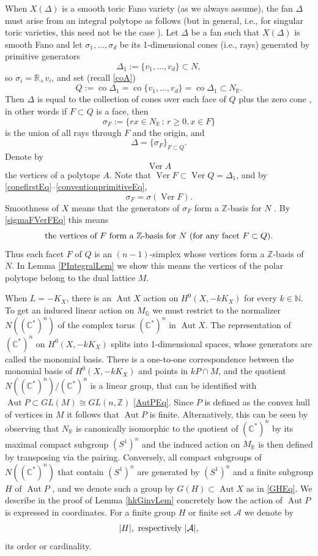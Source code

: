 \documentclass{article}
\newcommand\cA{{\mathcal A}}
\newcommand{\CC}{\mathbb {C}}
\newcommand{\NN}{{\mathbb N}}
\newcommand{\QQ}{{\mathbb Q}}
\newcommand{\RR}{{\mathbb R}}
\newcommand{\ZZ}{{\mathbb Z}}
\renewcommand{\>}{\rightarrow}
\DeclareMathOperator{\Aut}{Aut}
\DeclareMathOperator{\Ver}{Ver}
\DeclareMathOperator{\co}{co}
\theoremstyle{plain}
\theoremstyle{definition}
\newcommand{\beq}{\begin{equation}}
\newcommand{\eeq}{\end{equation}}
\def\lb#1{\label{#1}}
\begin{document}
When $X(\Delta)$ is a smooth
toric Fano variety (as we always assume), the fan $\Delta$
must arise from %
an integral polytope as 
follows (but in general, i.e., for 
singular toric varieties, this need not be the case \cite[p. 25]{Ful}).
Let $\Delta$ be a fan such that
$X(\Delta)$ is smooth Fano and let $\sigma_1,\ldots,\sigma_d$ be its 1-dimensional cones
(i.e., rays) generated by primitive generators 
\beq
\lb{Delta1Eq}
\Delta_1:=
\{v_1,\ldots,v_d\}\subset N,
\eeq
so $\sigma_i=\RR_{+}v_i$, and set (recall \eqref{coA})
\beq
\lb{QEq}
Q:=\co\Delta_1=\co\{v_1,\ldots,v_d\}=\co\Delta_1\subset N_\RR.
\eeq
Then $\Delta$ is equal to the 
collection of 
cones over each face of $Q$ plus the zero cone
\cite[p. 26]{Ful}, in other words if $F\subset Q$
is a face, then 
\beq
\lb{sigmaFEq}
\sigma_F:=\{rx\in N_\RR\,:\, r\ge0, x\in F\}
\eeq
is the union of all rays
through $F$ and the origin, and
$$
\Delta=\{\sigma_F\}_{F\subset Q}.
$$
Denote by
\beq
\lb{VerAEq}
\Ver A
\eeq
the vertices of a polytope $A$.
Note that $\Ver F\subset \Ver Q=\Delta_1$, and by \eqref{conefirstEq}--\eqref{conventionprimitiveEq},
\beq
\lb{sigmaFVerFEq}
\sigma_F=\sigma(\Ver F).
\eeq
Smoothness of $X$ means that the generators of $\sigma_F$
form a $\ZZ$-basis for $N$ 
\cite[p. 29]{Ful}. By \eqref{sigmaFVerFEq} this means 
\beq
\lb{smoothnessverticesEq}
\hbox{the
vertices of $F$ form a $\ZZ$-basis for $N$ (for any facet $F\subset Q$).}
\eeq
Thus each facet $F$ of $Q$ is an 
$(n-1)$-simplex whose vertices form a $\ZZ$-basis of $N$.
In Lemma \ref{PIntegralLem} we show this means the vertices of the polar polytope
belong to the dual lattice $M$.


When $L=-K_X$, there is an $\Aut X$ action on $H^0(X,-kK_X)$
for every $k\in\NN$. To get an induced linear action on $M_\QQ$
we must restrict to the normalizer $N((\CC^*)^n)$ of the complex torus $(\CC^*)^n$
in $\Aut X$. The representation of $(\CC^*)^n$ on $H^0(X,-kK_X)$
splits into 1-dimensional spaces, whose generators are called the monomial
basis. There is a one-to-one correspondence between the monomial basis of 
$H^0(X,-kK_X)$ and points in $kP\cap M$, and the  
quotient $N((\CC^*)^n)/(\CC^*)^n$ is a linear group,
that can be identified with $\Aut P\subset
GL(M)\cong GL(n,\ZZ)$
\eqref{AutPEq}. Since $P$ is defined as the convex hull
of vertices in $M$ it follows that $\Aut P$ is finite. 
Alternatively, this can be seen by observing that 
$N_\RR$ is canonically isomorphic to the quotient of  $(\CC^*)^n$ 
by its
maximal compact subgroup $(S^1)^n$ \cite[p. 229]{BS99}
and the induced action on $M_\RR$ is then defined
by transposing via the pairing.
Conversely, all  
compact subgroups of $N((\CC^*)^n)$ that contain $(S^1)^n$ are generated
by $(S^1)^n$ and a finite subgroup $H$ of $\Aut P$
\cite[Proposition 3.1]{BS99}, and we denote
such a group by $G(H)\subset \Aut X$ as in \eqref{GHEq}. We describe in the proof
of Lemma \ref{hkGinvLem} concretely
how the action of $\Aut P$ is expressed in coordinates.
For a finite group $H$ or finite set $\cA$ we denote by 
$$
|H|, \hbox{\ respectively\ } |\cA|,
$$
its order or cardinality.
\end{document}
